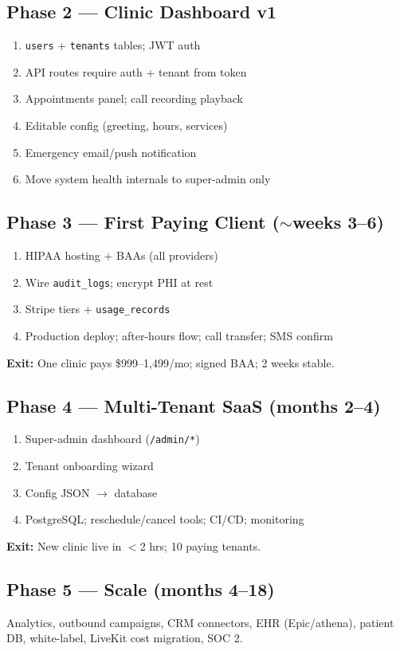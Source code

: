 \documentclass[11pt,a4paper]{article}
\begin{document}
\subsection{Phase 2 --- Clinic Dashboard v1}
\begin{enumerate}[nosep,start=7]
  \item \texttt{users} + \texttt{tenants} tables; JWT auth
  \item API routes require auth + tenant from token
  \item Appointments panel; call recording playback
  \item Editable config (greeting, hours, services)
  \item Emergency email/push notification
  \item Move system health internals to super-admin only
\end{enumerate}

\subsection{Phase 3 --- First Paying Client ($\sim$weeks 3--6)}
\begin{enumerate}[nosep,start=13]
  \item HIPAA hosting + BAAs (all providers)
  \item Wire \texttt{audit\_logs}; encrypt PHI at rest
  \item Stripe tiers + \texttt{usage\_records}
  \item Production deploy; after-hours flow; call transfer; SMS confirm
\end{enumerate}
\textbf{Exit:} One clinic pays \$999--1,499/mo; signed BAA; 2 weeks stable.

\subsection{Phase 4 --- Multi-Tenant SaaS (months 2--4)}
\begin{enumerate}[nosep,start=19]
  \item Super-admin dashboard (\texttt{/admin/*})
  \item Tenant onboarding wizard
  \item Config JSON $\rightarrow$ database
  \item PostgreSQL; reschedule/cancel tools; CI/CD; monitoring
\end{enumerate}
\textbf{Exit:} New clinic live in $<$2 hrs; 10 paying tenants.

\subsection{Phase 5 --- Scale (months 4--18)}
Analytics, outbound campaigns, CRM connectors, EHR (Epic/athena), patient DB, white-label, LiveKit cost migration, SOC 2.
\end{document}
